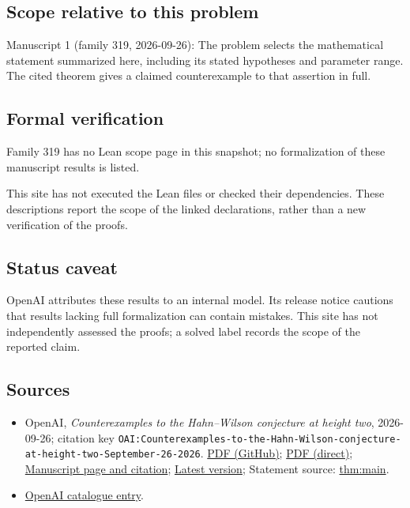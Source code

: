 \documentclass[11pt]{article}
\begin{document}
\subsection{Scope relative to this problem}
Manuscript 1 (family 319, 2026-09-26): The problem selects the mathematical statement summarized here, including its stated hypotheses and parameter range. The cited theorem gives a claimed counterexample to that assertion in full.

\subsection{Formal verification}
Family 319 has no Lean scope page in this snapshot; no formalization of these manuscript results is listed.

This site has not executed the Lean files or checked their dependencies. These descriptions report the scope of the linked declarations, rather than a new verification of the proofs.

\subsection{Status caveat}
OpenAI attributes these results to an internal model. Its release notice cautions that results lacking full formalization can contain mistakes. This site has not independently assessed the proofs; a solved label records the scope of the reported claim.

\subsection{Sources}
\begin{itemize}
\item OpenAI, \emph{Counterexamples to the Hahn–Wilson conjecture at height two}, 2026-09-26; citation key \texttt{OAI:Counterexamples-to-the-Hahn-Wilson-conjecture-at-height-two-September-26-2026}. \href{https://github.com/openai/math/blob/adc7f1241b42e322a6451854ab7e4b4c146bf78a/preprints/Counterexamples-to-the-Hahn-Wilson-conjecture-at-height-two-September-26-2026/paper.pdf}{PDF (GitHub)}; \href{https://github.com/openai/math/raw/adc7f1241b42e322a6451854ab7e4b4c146bf78a/preprints/Counterexamples-to-the-Hahn-Wilson-conjecture-at-height-two-September-26-2026/paper.pdf}{PDF (direct)}; \href{https://github.com/openai/math/blob/adc7f1241b42e322a6451854ab7e4b4c146bf78a/preprints/Counterexamples-to-the-Hahn-Wilson-conjecture-at-height-two-September-26-2026/README.md}{Manuscript page and citation}; \href{https://github.com/openai/math/blob/main/preprints/Counterexamples-to-the-Hahn-Wilson-conjecture-at-height-two-September-26-2026/paper.pdf}{Latest version}; Statement source: \href{https://github.com/openai/math/blob/adc7f1241b42e322a6451854ab7e4b4c146bf78a/preprints/Counterexamples-to-the-Hahn-Wilson-conjecture-at-height-two-September-26-2026/build/main.tex\#L114}{thm:main}.
\item \href{https://github.com/openai/math/blob/adc7f1241b42e322a6451854ab7e4b4c146bf78a/CONTENTS.md}{OpenAI catalogue entry}.
\end{itemize}
\end{document}
